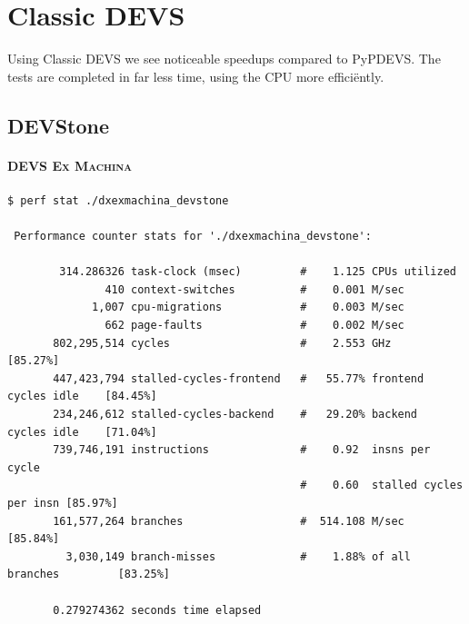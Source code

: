 \documentclass[8pt,a4paper]{report}
\begin{document}
\section{Classic DEVS}
Using Classic DEVS we see noticeable speedups compared to PyPDEVS. The tests are completed in far less time, using the CPU more effici\"ently.

\subsection{DEVStone}
\paragraph{\textsc{DEVS Ex Machina}}
\begin{Verbatim}[fontsize=\small]
$ perf stat ./dxexmachina_devstone 

 Performance counter stats for './dxexmachina_devstone':

        314.286326 task-clock (msec)         #    1.125 CPUs utilized          
               410 context-switches          #    0.001 M/sec                  
             1,007 cpu-migrations            #    0.003 M/sec                  
               662 page-faults               #    0.002 M/sec                  
       802,295,514 cycles                    #    2.553 GHz                     [85.27%]
       447,423,794 stalled-cycles-frontend   #   55.77% frontend cycles idle    [84.45%]
       234,246,612 stalled-cycles-backend    #   29.20% backend  cycles idle    [71.04%]
       739,746,191 instructions              #    0.92  insns per cycle        
                                             #    0.60  stalled cycles per insn [85.97%]
       161,577,264 branches                  #  514.108 M/sec                   [85.84%]
         3,030,149 branch-misses             #    1.88% of all branches         [83.25%]

       0.279274362 seconds time elapsed
\end{Verbatim}
\end{document}
